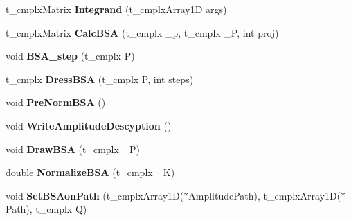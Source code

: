 \begin{DoxyCompactItemize}
\item 
\hypertarget{class_c___b_s_e___hadron___base_a342356938adc65eb49a6180830d9272b}{t\-\_\-cmplx\-Matrix {\bfseries Integrand} (t\-\_\-cmplx\-Array1\-D args)}\label{class_c___b_s_e___hadron___base_a342356938adc65eb49a6180830d9272b}

\item 
\hypertarget{class_c___b_s_e___hadron___base_a5671a156baf8bb263179c701a73799e7}{t\-\_\-cmplx\-Matrix {\bfseries Calc\-B\-S\-A} (t\-\_\-cmplx \-\_\-p, t\-\_\-cmplx \-\_\-\-P, int proj)}\label{class_c___b_s_e___hadron___base_a5671a156baf8bb263179c701a73799e7}

\item 
\hypertarget{class_c___b_s_e___hadron___base_a0fa46796bc9bf9966431faa9b114310b}{void {\bfseries B\-S\-A\-\_\-step} (t\-\_\-cmplx P)}\label{class_c___b_s_e___hadron___base_a0fa46796bc9bf9966431faa9b114310b}

\item 
\hypertarget{class_c___b_s_e___hadron___base_a1dc4759e215bfdcc54019cb214df9a40}{t\-\_\-cmplx {\bfseries Dress\-B\-S\-A} (t\-\_\-cmplx P, int steps)}\label{class_c___b_s_e___hadron___base_a1dc4759e215bfdcc54019cb214df9a40}

\item 
\hypertarget{class_c___b_s_e___hadron___base_a0aed446cf0d0b4fccb40b7b6739a5447}{void {\bfseries Pre\-Norm\-B\-S\-A} ()}\label{class_c___b_s_e___hadron___base_a0aed446cf0d0b4fccb40b7b6739a5447}

\item 
\hypertarget{class_c___b_s_e___hadron___base_af87c77312f696ee1b65f40af1dea009a}{void {\bfseries Write\-Amplitude\-Descyption} ()}\label{class_c___b_s_e___hadron___base_af87c77312f696ee1b65f40af1dea009a}

\item 
\hypertarget{class_c___b_s_e___hadron___base_ac544e1f919da9b6935b6b36be279e848}{void {\bfseries Draw\-B\-S\-A} (t\-\_\-cmplx \-\_\-\-P)}\label{class_c___b_s_e___hadron___base_ac544e1f919da9b6935b6b36be279e848}

\item 
\hypertarget{class_c___b_s_e___hadron___base_af04cefa24f08a0dfa30f47d8820172f7}{double {\bfseries Normalize\-B\-S\-A} (t\-\_\-cmplx \-\_\-\-K)}\label{class_c___b_s_e___hadron___base_af04cefa24f08a0dfa30f47d8820172f7}

\item 
\hypertarget{class_c___b_s_e___hadron___base_aba02789ff7e2929e73a8eff146d2c313}{void {\bfseries Set\-B\-S\-Aon\-Path} (t\-\_\-cmplx\-Array1\-D($\ast$Amplitude\-Path), t\-\_\-cmplx\-Array1\-D($\ast$Path), t\-\_\-cmplx Q)}\label{class_c___b_s_e___hadron___base_aba02789ff7e2929e73a8eff146d2c313}


\end{DoxyCompactItemize}
